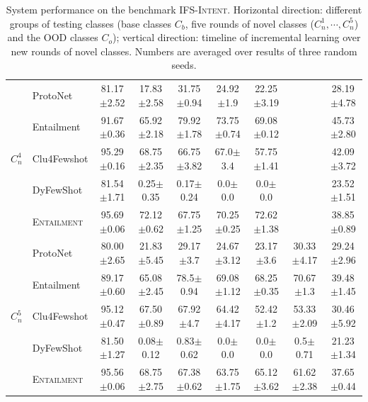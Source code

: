 \documentclass[11pt]{article}
\newcommand{\modelname}{\textsc{Entailment}}
\newcommand{\intentdata}{\textsc{IFS-Intent}}
\begin{document}
\begin{table}[t]
\begin{tabular}{ll|c|c|c|c|c|c|c}
  
 \multirow{5}{*}{$C_n^4$} & ProtoNet & 81.17$\pm$2.52 &17.83$\pm$2.58 &31.75$\pm$0.94 &24.92$\pm$1.9 &22.25$\pm$3.19 & & 28.19$\pm$4.78\\
 & Entailment &91.67$\pm$0.36 &65.92$\pm$2.18 & 79.92$\pm$1.78&73.75$\pm$0.74 &69.08$\pm$0.12 & & 45.73$\pm$2.80\\
  &  Clu4Fewshot & 95.29$\pm$0.16&68.75$\pm$2.35 &66.75$\pm$3.82 & 67.0$\pm$3.4& 57.75$\pm$1.41& &  42.09$\pm$3.72\\
& DyFewShot &81.54$\pm$1.71 &0.25$\pm$0.35&0.17$\pm$0.24&0.0$\pm$0.0&0.0$\pm$0.0& & 23.52$\pm$1.51 \\
  &  \modelname & 95.69$\pm$0.06& 72.12$\pm$0.62& 67.75$\pm$1.25&70.25$\pm$0.25 & 72.62$\pm$1.38& &  38.85$\pm$0.89\\\hline
  
 \multirow{5}{*}{$C_n^5$} & ProtoNet & 80.00$\pm$2.65 &21.83$\pm$5.45 &29.17$\pm$3.7 & 24.67$\pm$3.12& 23.17$\pm$3.6& 30.33$\pm$4.17& 29.24$\pm$2.96\\
 & Entailment &89.17$\pm$0.60 & 65.08$\pm$2.45&78.5$\pm$0.94 & 69.08$\pm$1.12&68.25$\pm$0.35 &70.67$\pm$1.3& 39.48$\pm$1.45\\
  &  Clu4Fewshot  &95.12$\pm$0.47 &67.50$\pm$0.89 &67.92$\pm$4.7 & 64.42$\pm$4.17& 52.42$\pm$1.2& 53.33$\pm$2.09& 30.46$\pm$5.92\\
  & DyFewShot &81.50$\pm$1.27 &0.08$\pm$0.12&0.83$\pm$0.62&0.0$\pm$0.0&0.0$\pm$0.0&0.5$\pm$0.71& 21.23$\pm$1.34\\
  &  \modelname & 95.56$\pm$0.06&68.75$\pm$2.75 & 67.38$\pm$0.62& 63.75$\pm$1.75&65.12$\pm$3.62 &61.62$\pm$2.38 &37.65$\pm$0.44\\ \hline
\end{tabular}
\caption{System performance on the benchmark \intentdata. Horizontal direction: different groups of testing classes (base classes $C_b$, five rounds of novel classes ($C_n^1, \cdots, C_n^5$) and the OOD classes $C_o$); vertical direction: timeline of incremental learning over new rounds of novel classes.  Numbers are averaged over results of three random seeds.}\label{tab:intentresults}
\end{table}
\end{document}
